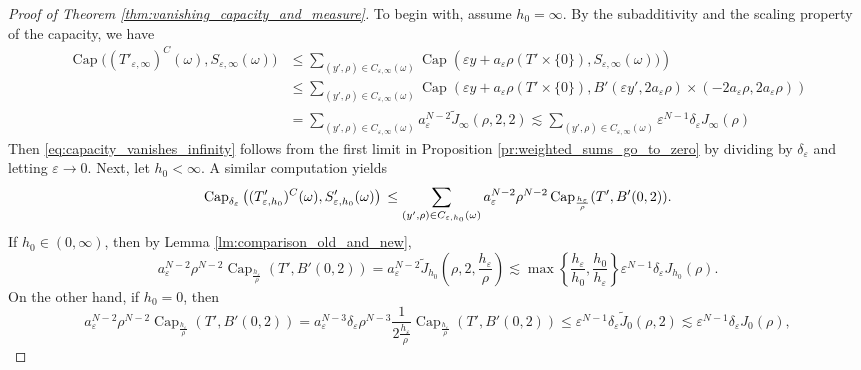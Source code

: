 \documentclass{article}
\numberwithin{equation}{section}
\theoremstyle{definition}
\theoremstyle{remark}
\newcommand{\cpct}{\operatorname{Cap}}
\begin{document}
\begin{proof}[Proof of Theorem \ref{thm:vanishing_capacity_and_measure}]
    To begin with, assume $h_0 = \infty$. By the subadditivity and the scaling property of the capacity, we have
    \begin{align*}
        \cpct \big((T'_{\varepsilon, \infty})^C(\omega), S_{\varepsilon, \infty}(\omega)\big) &\le \sum_{(y', \rho) \in C_{\varepsilon, \infty}(\omega)} \cpct\left(\varepsilon y + a_\varepsilon \rho (T' \times \{0\}), S_{\varepsilon, \infty}(\omega))\right) \\
        &\le \sum_{(y', \rho) \in C_{\varepsilon, \infty}(\omega)} \cpct\left(\varepsilon y + a_\varepsilon \rho (T' \times \{0\}), B'(\varepsilon y', 2a_\varepsilon \rho) \times (-2a_\varepsilon \rho, 2a_\varepsilon \rho)\right) \\
        &= \sum_{(y', \rho) \in C_{\varepsilon, \infty}(\omega)} a_\varepsilon^{N - 2} \tilde{J}_\infty(\rho, 2, 2) \lesssim \sum_{(y', \rho) \in C_{\varepsilon, \infty}(\omega)} \varepsilon^{N - 1} \delta_\varepsilon J_\infty(\rho)
    \end{align*}
    Then \eqref{eq:capacity_vanishes_infinity} follows from the first limit in Proposition \ref{pr:weighted_sums_go_to_zero} by dividing by $\delta_\varepsilon$ and letting $\varepsilon \to 0$. Next, let $h_0 < \infty$. A similar computation yields
    \begin{equation*}
        \cpct_{\delta_\varepsilon}\left((T'_{\varepsilon, h_0})^C(\omega), S'_{\varepsilon, h_0}(\omega)\right) \\ 
        \le \sum_{(y', \rho) \in C_{\varepsilon, h_0}(\omega)} a_\varepsilon^{N - 2} \rho^{N - 2} \cpct_{\frac{h_\varepsilon}{\rho}}(T', B'(0, 2)).
    \end{equation*}
    If $h_0 \in (0, \infty)$, then by Lemma \ref{lm:comparison_old_and_new},
    \[
    a_\varepsilon^{N - 2} \rho^{N - 2} \cpct_{\frac{h_\varepsilon}{\rho}}(T', B'(0, 2)) = a_\varepsilon^{N - 2} \tilde{J}_{h_0}\left(\rho, 2, \frac{h_\varepsilon}{\rho}\right) \lesssim \max \left\{\frac{h_\varepsilon}{h_0}, \frac{h_0}{h_\varepsilon}\right\} \varepsilon^{N - 1} \delta_\varepsilon J_{h_0}(\rho).
    \]
    On the other hand, if $h_0 = 0$, then
    \[
    a_\varepsilon^{N - 2} \rho^{N - 2} \cpct_{\frac{h_\varepsilon}{\rho}}(T', B'(0, 2)) = a_\varepsilon^{N - 3} \delta_\varepsilon \rho^{N - 3} \frac{1}{2\frac{h_\varepsilon}{\rho}}\cpct_{\frac{h_\varepsilon}{\rho}}(T', B'(0, 2)) \le \varepsilon^{N - 1} \delta_\varepsilon \tilde{J}_0(\rho, 2) \lesssim \varepsilon^{N - 1} \delta_\varepsilon J_0(\rho),
\]
\end{proof}
\end{document}
